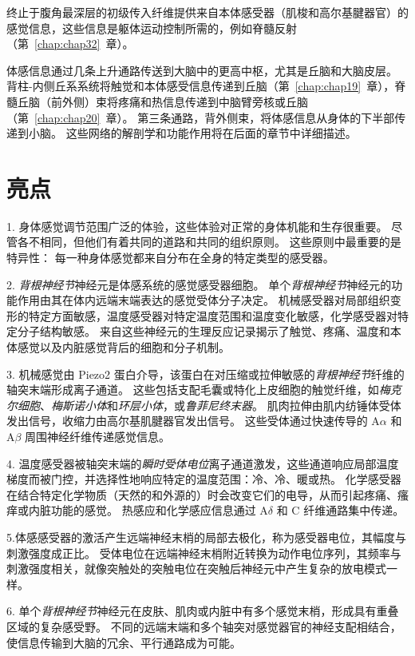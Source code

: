 终止于腹角最深层的初级传入纤维提供来自本体感受器（肌梭和高尔基腱器官）的感觉信息，这些信息是躯体运动控制所需的，例如脊髓反射（第~\ref{chap:chap32}~章）。


体感信息通过几条上升通路传送到大脑中的更高中枢，尤其是丘脑和大脑皮层。
背柱-内侧丘系系统将触觉和本体感受信息传递到丘脑（第~\ref{chap:chap19}~章），脊髓丘脑（前外侧）束将疼痛和热信息传递到中脑臂旁核或丘脑（第~\ref{chap:chap20}~章）。
第三条通路，背外侧束，将体感信息从身体的下半部传递到小脑。
这些网络的解剖学和功能作用将在后面的章节中详细描述。




\section{亮点}


1. 身体感觉调节范围广泛的体验，这些体验对正常的身体机能和生存很重要。
尽管各不相同，但他们有着共同的道路和共同的组织原则。
这些原则中最重要的是特异性：
每一种身体感觉都来自分布在全身的特定类型的感受器。 


2. \textit{背根神经节}神经元是体感系统的感觉感受器细胞。
单个\textit{背根神经节}神经元的功能作用由其在体内远端末端表达的感觉受体分子决定。
机械感受器对局部组织变形的特定方面敏感，温度感受器对特定温度范围和温度变化敏感，化学感受器对特定分子结构敏感。
来自这些神经元的生理反应记录揭示了触觉、疼痛、温度和本体感觉以及内脏感觉背后的细胞和分子机制。 


3. 机械感觉由 Piezo2 蛋白介导，该蛋白在对压缩或拉伸敏感的\textit{背根神经节}纤维的轴突末端形成离子通道。
这些包括支配毛囊或特化上皮细胞的触觉纤维，如\textit{梅克尔细胞}、\textit{梅斯诺小体}和\textit{环层小体}，或\textit{鲁菲尼终末器}。
肌肉拉伸由肌内纺锤体受体发出信号，收缩力由高尔基肌腱器官发出信号。
这些受体通过快速传导的 A$\alpha$ 和 A$\beta$ 周围神经纤维传递感觉信息。


4. 温度感受器被轴突末端的\textit{瞬时受体电位}离子通道激发，这些通道响应局部温度梯度而被门控，并选择性地响应特定的温度范围：冷、冷、暖或热。
化学感受器在结合特定化学物质（天然的和外源的）时会改变它们的电导，从而引起疼痛、瘙痒或内脏功能的感觉。
热感应和化学感应信息通过 A$\delta$ 和 C 纤维通路集中传递。 


5.体感感受器的激活产生远端神经末梢的局部去极化，称为感受器电位，其幅度与刺激强度成正比。
受体电位在远端神经末梢附近转换为动作电位序列，其频率与刺激强度相关，就像突触处的突触电位在突触后神经元中产生复杂的放电模式一样。


6. 单个\textit{背根神经节}神经元在皮肤、肌肉或内脏中有多个感觉末梢，形成具有重叠区域的复杂感受野。
不同的远端末端和多个轴突对感觉器官的神经支配相结合，使信息传输到大脑的冗余、平行通路成为可能。 


